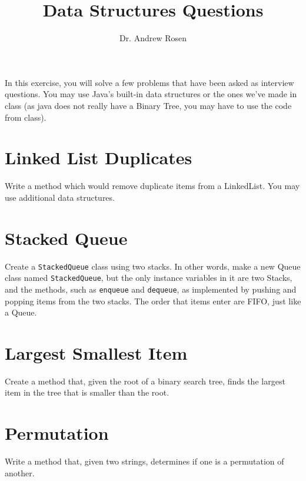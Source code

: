 \documentclass[10pt,letterpaper]{article}
\author{Dr. Andrew Rosen}
\title{Data Structures Questions}
\date{}
\begin{document}
	
	\maketitle
	
	In this exercise, you will solve a few problems that have been asked as interview questions.
	You may use Java's built-in data structures or the ones we've made in class (as java does not really have a Binary Tree, you may have to use the code from class).
	
	\newpage
	\section{Linked List Duplicates}
	Write a method which would remove duplicate items from a LinkedList.
	You may use additional data structures.
	
	
	\section{Stacked Queue}
	Create  a \texttt{StackedQueue} class using two stacks.  In other words, make a new Queue class named \texttt{StackedQueue}, but the only instance variables in it are two Stacks, and the methods, such as \texttt{enqueue} and \texttt{dequeue}, as implemented by pushing and popping items from the two stacks.
	The order that items enter are FIFO, just like a Queue.
	
	
	\section{Largest Smallest Item}
	Create a method that, given the root of a binary search tree, finds the largest item in the tree that is smaller than the root.

	\section{Permutation}
	Write a method that, given two strings, determines if one is a permutation of another.
	
\end{document}
